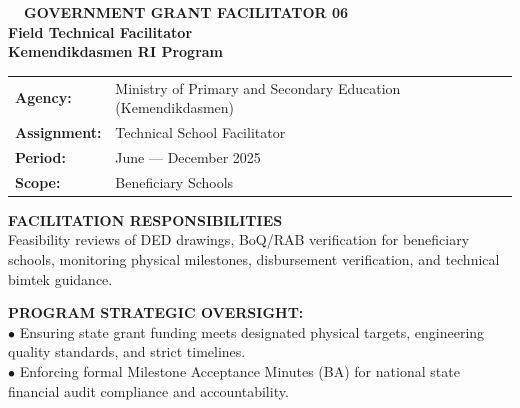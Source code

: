 \documentclass[10pt,a4paper,landscape]{article}
\begin{document}
\noindent
\begin{minipage}[t]{0.30\linewidth}
  \vspace{0pt}
  \begin{tcolorbox}[sharp corners, boxrule=0.8pt, colframe=pborder, colback=white, left=3mm, right=3mm, top=2.5mm, bottom=2.5mm, height=100mm]
    \colorbox{pred}{\fontsize{7pt}{8pt}\selectfont\bfseries\color{white}\ \ GOVERNMENT GRANT FACILITATOR 06\ \ }\\[1.5mm]
    {\fontsize{9.5pt}{11.5pt}\selectfont\bfseries\color{pnavy}Field Technical Facilitator}\\[0.5mm]
    {\fontsize{7pt}{8.5pt}\selectfont\bfseries\color{pred}Kemendikdasmen RI Program}\\[2mm]

    \begin{tcolorbox}[sharp corners, boxrule=0.5pt, colframe=pborder, colback=pbglight, left=2mm, right=2mm, top=1.5mm, bottom=1.5mm]
      \begin{tabularx}{\linewidth}{@{}p{22mm} X@{}}
        {\fontsize{6.8pt}{8pt}\selectfont\bfseries Agency:} & {\fontsize{6.8pt}{8pt}\selectfont Ministry of Primary and Secondary Education (Kemendikdasmen)} \\[0.8mm]
        {\fontsize{6.8pt}{8pt}\selectfont\bfseries Assignment:} & {\fontsize{6.8pt}{8pt}\selectfont Technical School Facilitator} \\[0.8mm]
        {\fontsize{6.8pt}{8pt}\selectfont\bfseries Period:} & {\fontsize{6.8pt}{8pt}\selectfont June --- December 2025} \\[0.8mm]
        {\fontsize{6.8pt}{8pt}\selectfont\bfseries Scope:} & {\fontsize{6.8pt}{8pt}\selectfont Beneficiary Schools}
      \end{tabularx}
    \end{tcolorbox}
    \vspace{1.5mm}

    {\fontsize{7.5pt}{9pt}\selectfont\bfseries\color{pnavy}FACILITATION RESPONSIBILITIES}\\[0.8mm]
    {\fontsize{6.5pt}{8.2pt}\selectfont\color{psteel}
    Feasibility reviews of DED drawings, BoQ/RAB verification for beneficiary schools, monitoring physical milestones, disbursement verification, and technical bimtek guidance.
    }
  \end{tcolorbox}
  \vspace{2mm}

  \begin{tcolorbox}[sharp corners, boxrule=0.6pt, colframe=pnavy, colback=pbglight, left=2.5mm, right=2.5mm, top=2mm, bottom=2mm, height=52mm]
    {\fontsize{7pt}{8.5pt}\selectfont\bfseries\color{pnavy}PROGRAM STRATEGIC OVERSIGHT:}\\[1.5mm]
    {\fontsize{6.5pt}{8.2pt}\selectfont\color{psteel}
    $\bullet$ Ensuring state grant funding meets designated physical targets, engineering quality standards, and strict timelines.\\
    $\bullet$ Enforcing formal Milestone Acceptance Minutes (BA) for national state financial audit compliance and accountability.
    }
  \end{tcolorbox}
\end{minipage}%
\end{document}
